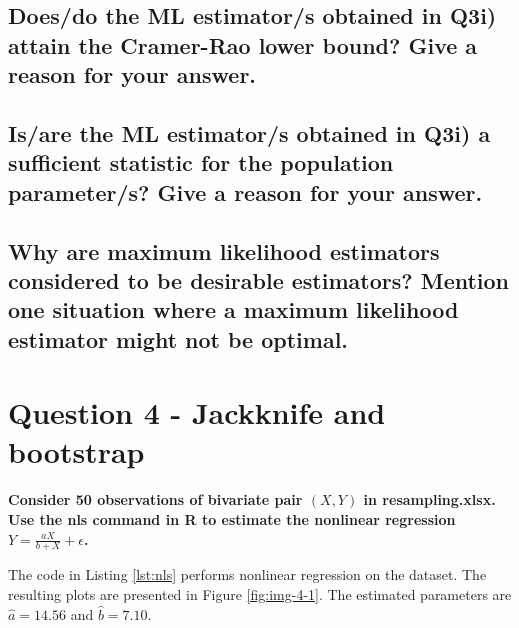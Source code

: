 \documentclass[]{article}
\begin{document}
\subsection{Does/do the ML estimator/s obtained in Q3i) attain the Cramer-Rao lower bound?  Give a reason for your answer. }

\subsection{Is/are the ML estimator/s obtained in Q3i) a sufficient statistic for the population parameter/s?  Give a reason for your answer.}

\subsection{Why are maximum likelihood estimators considered to be desirable estimators?  Mention one situation where a maximum likelihood estimator might not be optimal.   }


\section{Question 4 - Jackknife and bootstrap}

\textbf{Consider 50 observations of bivariate pair $(X,Y)$ in resampling.xlsx. Use the nls command in R to estimate the nonlinear regression $Y=\frac{aX}{b+X} + \epsilon$.}

\bigskip

The code in Listing \ref{lst:nls} performs nonlinear regression on the dataset. The resulting plots are presented in Figure \ref{fig:img-4-1}. The estimated parameters are $\hat{a} = 14.56$ and $\hat{b} = 7.10$.
\end{document}
